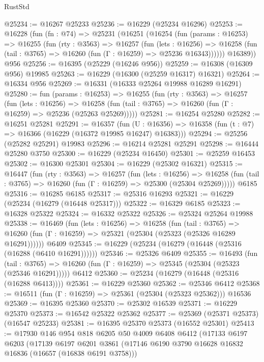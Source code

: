 \begin{lexlean}{RustStd}
\begin{coremodule}
@25234 := @16267 @25233
@25236 := @16229 (@25234 @16296)
@25253 := @16228
    (fun (fn : @74) =>
    @25231
      (@16251
        (@16254
          (fun (params : @16253) =>
          @16255
            (fun (rty : @3563) =>
            @16257
              (fun (lets : @16256) =>
              @16258 (fun (tail : @3765) => @16260 (fun (Γ : @16259) => @25236 @16343))))))
        @16389))
    @956
@25256 := @16395 (@25229 (@16246 @956))
@25259 := @16308 (@16309 @956) @19985
@25263 := @16229 (@16300 (@25259 @16317) @16321)
@25264 := @16334 @956
@25269 := @16331 (@16333 @25264 @19988 @16289 @16291)
@25280 := fun (params : @16253) =>
  @16255
    (fun (rty : @3563) =>
    @16257
      (fun (lets : @16256) =>
      @16258 (fun (tail : @3765) => @16260 (fun (Γ : @16259) => @25236 (@25263 @25269)))))
@25281 := @16254 @25280
@25282 := @16251 @25281
@25291 := @16357
    (fun (U : @16356) => @16358 (fun (t : @7) => @16366 (@16229 (@16372 @19985 @16247) @16383)))
@25294 := @25256 (@25282 @25291) @19983
@25296 := @16214 @25281 @25291
@25298 := @16444 @25280 @3750
@25300 := @16229 (@25234 @16450)
@25301 := @25259 @16453
@25302 := @16300 @25301
@25304 := @16229 (@25302 @16321)
@25315 := @16447
    (fun (rty : @3563) =>
    @16257
      (fun (lets : @16256) =>
      @16258 (fun (tail : @3765) => @16260 (fun (Γ : @16259) => @25300 (@25304 @25269)))))
    @6185
@25316 := @16285 @6185
@25317 := @25316 @16293
@25321 := @16229 (@25234 (@16279 (@16448 @25317)))
@25322 := @16329 @6185
@25323 := @16328 @25322
@25324 := @16332 @25322
@25326 := @25324 @25264 @19988
@25338 := @16469
    (fun (lets : @16256) =>
    @16258
      (fun (tail : @3765) =>
      @16260 (fun (Γ : @16259) => @25321 (@25304 (@25323 (@25326 @16289 @16291))))))
    @6409
@25345 := @16229 (@25234 (@16279 (@16448 (@25316 (@16288 (@6410 @16291))))))
@25346 := @25326 @6409
@25355 := @16493
    (fun (tail : @3765) => @16260 (fun (Γ : @16259) => @25345 (@25304 (@25323 (@25346 @16291)))))
    @6412
@25360 := @25234 (@16279 (@16448 (@25316 (@16288 @6413))))
@25361 := @16229 @25360
@25362 := @25346 @6412
@25368 := @16511 (fun (Γ : @16259) => @25361 (@25304 (@25323 @25362))) @16536
@25369 := @16395 @25360
@25370 := @25302 @16539
@25371 := @16229 @25370
@25373 := @16542 @25322 @25362
@25377 := @25369 (@25371 @25373) (@16547 @25233)
@25381 := @16395 @25370 @25373 (@16552 @25301)
@25413 := @17930
    @146
    @954
    @818
    @6205
    @50
    @4009
    @6408
    @6412
    (@17133
      @6197
      @6203
      (@17139
        @6197
        @6201
        @3861
        (@17146 @6190 @3790 @16628 @16832 @16836 (@16657 (@16838 @6191 @3758)))

\end{coremodule}
\end{lexlean}

